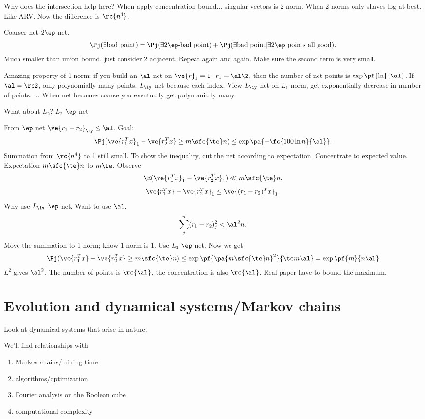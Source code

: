 Why does the intersection help here? When apply concentration bound...
singular vectors is 2-norm. When 2-norms only shaves log at best. Like ARV. Now the difference is $\rc{n^4}$. 

Coarser net $2\ep$-net. 
\[
\Pj(\exists \text{bad point})= \Pj(\exists 2\ep\text{-bad point}) + \Pj(\exists \text{bad point}|\exists 2\ep\text{ points all good}).
\]
Much smaller than union bound. just consider 2 adjacent. Repeat again and again. Make sure the second term is very small. 

Amazing property of 1-norm:
if you build an $\al$-net on $\ve{r}_1=1$, $r_1=\al \Z$, then the number of net points is $\exp\pf{\ln}{\al}$. If $\al=\rc2$, only polynomially many points. $L_{\iy}$ net because each index. View $L_{\iy}$ net on $L_1$ norm, get exponentially decrease in number of points. ...
When net becomes coarse you eventually get polynomially many.

What about $L_2$? $L_2$ $\ep$-net. 

From $\ep$ net $\ve{r_1-r_2}_{\iy}\le \al$. Goal:
\[
\Pj(\ve{r_1^Tx}_1-\ve{r_2^Tx}\ge m\sfc{\te}n) \le \exp\pa{
-\fc{100\ln n}{\al}
}.
\]
Summation from $\rc{n^4}$ to 1 still small. 
To show the inequality, cut the net according to expectation. Concentrate to expected value. Expectation $m\sfc{\te}n$ to $m\te$.
Observe
\[
\E(\ve{r_1^Tx}_1-\ve{r_2^Tx}_1)\ll m\sfc{\te}n.
\]
\[
\ve{r_1^Tx}-\ve{r_2^Tx}_1\le \ve{(r_1-r_2)^Tx}_1.
\]
Why use $L_{\iy}$ $\ep$-net. Want to use $\al$.
\[
\sum_j^n(r_1-r_2)_j^2<\al^2 n.
\]
Move the summation to 1-norm; know 1-norm is 1. Use $L_2$ $\ep$-net. 
Now we get 
\[
\Pj(\ve{r_1^Tx}-\ve{r_2^Tx}\ge m\sfc{\te}n)
\le \exp\pf{\pa{m\sfc{\te}n}^2}{\te m \al}=\exp\pf{m}{n\al}
\]
$L^2$ gives $\al^2$. The number of points is $\rc{\al}$, the concentration is also $\rc{\al}$. Real paper have to bound the maximum. 




\section{Evolution and dynamical systems/Markov chains}

Look at dynamical systems that arise in nature.

We'll find relationships with
\begin{enumerate}
\item
Markov chains/mixing time
\item algorithms/optimization
\item Fourier analysis on the Boolean cube
\item computational complexity
\end{enumerate}

